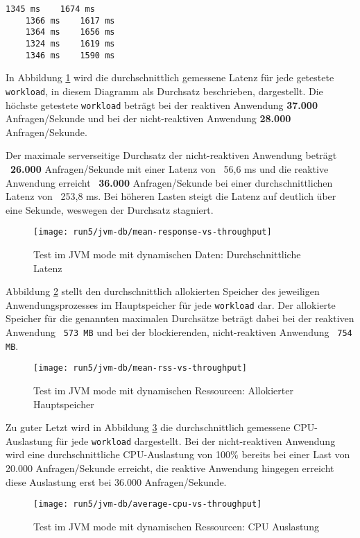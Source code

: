 \begin{lstlisting}[caption=Startzeiten im JVM mode mit dynamischen Ressourcen, captionpos=b, label=lst:starttimes_jvm_dynamic]
    1345 ms    1674 ms
    1366 ms    1617 ms
    1364 ms    1656 ms 
    1324 ms    1619 ms 
    1346 ms    1590 ms 
\end{lstlisting}

In Abbildung \ref{fig:jvm_dynamic_mean_response} wird die durchschnittlich gemessene Latenz für jede getestete \verb|workload|,
in diesem Diagramm als Durchsatz beschrieben, dargestellt.
Die höchste getestete \verb|workload| beträgt bei der reaktiven Anwendung \textbf{37.000} Anfragen/Sekunde und bei der
nicht-reaktiven Anwendung \textbf{28.000} Anfragen/Sekunde.

Der maximale serverseitige Durchsatz der nicht-reaktiven Anwendung beträgt ~\textbf{26.000} Anfragen/Sekunde mit einer
Latenz von ~56,6 ms und
die reaktive Anwendung erreicht ~\textbf{36.000} Anfragen/Sekunde bei einer durchschnittlichen Latenz von ~253,8 ms.
Bei höheren Lasten steigt die Latenz auf deutlich über eine Sekunde, weswegen der Durchsatz stagniert.
\newpage
\begin{figure}[ht!]
    \centering
    \texttt{[image: run5/jvm-db/mean-response-vs-throughput]}
    \caption{Test im JVM mode mit dynamischen Daten: Durchschnittliche Latenz}
    \label{fig:jvm_dynamic_mean_response}
\end{figure}
Abbildung \ref{fig:jvm_dynamic_mean_rss} stellt den durchschnittlich allokierten Speicher des jeweiligen Anwendungsprozesses
im Hauptspeicher für jede \verb|workload| dar. Der allokierte Speicher für die genannten maximalen Durchsätze beträgt dabei bei
der reaktiven Anwendung ~\verb|573 MB| und bei der blockierenden, nicht-reaktiven Anwendung ~\verb|754 MB|.
\newpage
\begin{figure}[ht!]
    \centering
    \texttt{[image: run5/jvm-db/mean-rss-vs-throughput]}
    \caption{Test im JVM mode mit dynamischen Ressourcen: Allokierter Hauptspeicher}
    \label{fig:jvm_dynamic_mean_rss}
\end{figure}

Zu guter Letzt wird in Abbildung \ref{fig:jvm_dynamic_avg_cpu} die durchschnittlich gemessene CPU-Auslastung für jede \verb|workload|
dargestellt. Bei der nicht-reaktiven Anwendung wird eine durchschnittliche CPU-Auslastung von 100\% bereits bei einer Last von
20.000 Anfragen/Sekunde erreicht, die reaktive Anwendung hingegen erreicht diese Auslastung erst bei 36.000 Anfragen/Sekunde.
\newpage
\begin{figure}[ht!]
    \centering
    \texttt{[image: run5/jvm-db/average-cpu-vs-throughput]}
    \caption{Test im JVM mode mit dynamischen Ressourcen: CPU Auslastung}
    \label{fig:jvm_dynamic_avg_cpu}
\end{figure}

